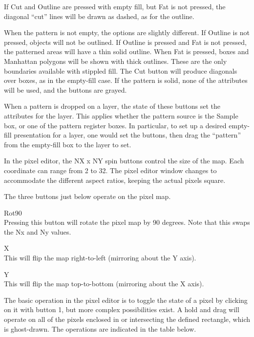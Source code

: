 If {\cb Cut} and {\cb Outline} are pressed with empty fill, but {\cb
Fat} is not pressed, the diagonal ``cut'' lines will be drawn as
dashed, as for the outline.

When the pattern is not empty, the options are slightly different.  If
{\cb Outline} is not pressed, objects will not be outlined.  If {\cb
Outline} is pressed and {\cb Fat} is not pressed, the patterned areas
will have a thin solid outline.  When {\cb Fat} is pressed, boxes and
Manhattan polygons will be shown with thick outlines.  These are the
only boundaries available with stippled fill.  The {\cb Cut} button
will produce diagonals over boxes, as in the empty-fill case.  If the
pattern is solid, none of the attributes will be used, and the buttons
are grayed.

When a pattern is dropped on a layer, the state of these buttons set
the attributes for the layer.  This applies whether the pattern source
is the {\cb Sample} box, or one of the pattern register boxes.  In
particular, to set up a desired empty-fill presentation for a layer,
one would set the buttons, then drag the ``pattern'' from the
empty-fill box to the layer to set.

In the pixel editor, the {\cb NX x NY} spin buttons control the size
of the map.  Each coordinate can range from 2 to 32.  The pixel editor
window changes to accommodate the different aspect ratios, keeping the
actual pixels square.

The three buttons just below operate on the pixel map.
\begin{description}
\item{\cb Rot90}\\
Pressing this button will rotate the pixel map by 90 degrees.  Note that
this swaps the Nx and Ny values.

\item{\cb X}\\
This will flip the map right-to-left (mirroring about the Y axis).

\item{\cb Y}\\
This will flip the map top-to-bottom (mirroring about the X axis).
\end{description}

The basic operation in the pixel editor is to toggle the state of a
pixel by clicking on it with button 1, but more complex possibilities
exist.  A hold and drag will operate on all of the pixels enclosed in
or intersecting the defined rectangle, which is ghost-drawn.  The
operations are indicated in the table below.

